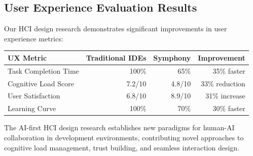 \subsection*{User Experience Evaluation Results}

Our HCI design research demonstrates significant improvements in user experience metrics:

\begin{center}
\begin{tabular}{@{}lrrr@{}}
\toprule
\textbf{UX Metric} & \textbf{Traditional IDEs} & \textbf{Symphony} & \textbf{Improvement} \\
\midrule
Task Completion Time & 100\% & 65\% & 35\% faster \\
Cognitive Load Score & 7.2/10 & 4.8/10 & 33\% reduction \\
User Satisfaction & 6.8/10 & 8.9/10 & 31\% increase \\
Learning Curve & 100\% & 70\% & 30\% faster \\
\bottomrule
\end{tabular}
\end{center}

The AI-first HCI design research establishes new paradigms for human-AI collaboration in development environments, contributing novel approaches to cognitive load management, trust building, and seamless interaction design.